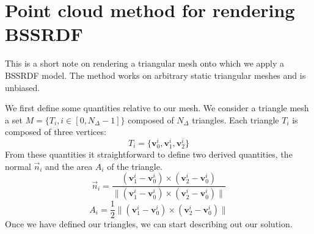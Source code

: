 \documentclass[10pt,a4paper]{article}
\begin{document}
 
\newcommand{\vecfunc}[2] {\vec{#1}(\mathbf{#2})}
\newcommand{\func}[2] {{#1}(\mathbf{#2})}
\newcommand{\omegafunc}[2] {{#1}(\mathbf{#2}, \vec{\omega})}

\newcommand{\xvecfunc}[1] {\vecfunc{#1}{x}}
\newcommand{\xfunc}[1] {\func{#1}{x}}
\newcommand{\xomegafunc}[1] {\omegafunc{#1}{x}}
\newcommand{\nablavec} {{\nabla}}
\newcommand{\omegavec} {\vec{\omega}}
\newcommand{\sphere}[2] {\int_{4\pi}{#1}\ d{\ifthenelse{\isempty{#2}{}}{{\omega}}{#2}}}
\newcommand{\hemisphere}[2] {\int_{2\pi_+}{#1}\ d{\ifthenelse{\isempty{#2}{}}{{\omega}}{#2}}}
\newcommand{\inwardhemisphere}[2] {\int_{2\pi_-}{#1}\ d{\ifthenelse{\isempty{#2}{}}{{\omega}}{#2}}}

\newcommand{\absorption}{\sigma_a}
\newcommand{\transmission}{\sigma_{tr}}
\newcommand{\scattering}{\sigma_s}
\newcommand{\extinction}{\sigma_t}
\newcommand{\fluence}{G_0}
\newcommand{\flux}{\mathbf{G}_1}
\newcommand{\sourcezero}[1]{\func{q}{#1}}
\newcommand{\sourcezerox}{\xfunc{q}}
\newcommand{\sourceone}[1]{\vec{\mathbf{Q}}(\mathbf{#1}, \omegavec)}
\newcommand{\sourceonex}{\vec{\mathbf{Q}}(\mathbf{x}, \omegavec)}
\newcommand{\redsca}{{\sigma}'_s}
\newcommand{\redext}{{\sigma}'_t}
\newcommand{\redscaEddington}{\tilde{\sigma}_s}
\newcommand{\redextEddington}{\tilde{\sigma}_t}
\newcommand{\de}{\text{d}}
\newcommand{\cphi}{C_{\phi}}
\newcommand{\cE}{C_{\mathbf{E}}}

\section*{Point cloud method for rendering BSSRDF}

This is a short note on rendering a triangular mesh onto which we apply a BSSRDF model. The method works on arbitrary static triangular meshes and is unbiased.

We first define some quantities relative to our mesh. We consider a triangle mesh a set $M = \{T_i, i \in [0, N_\Delta - 1] \}$ composed of $N_{\Delta}$ triangles. Each triangle $T_i$ is composed of three vertices:
$$
T_i = \{ \mathbf{v}^i_0, \mathbf{v}^i_1, \mathbf{v}^i_2 \}
$$
From these quantities it straightforward to define two derived quantities, the normal $\vec{n}_i$ and the area $A_i$ of the triangle. 
$$
\vec{n}_i = \frac{(\mathbf{v}^i_1 - \mathbf{v}^i_0) \times (\mathbf{v}^i_2 - \mathbf{v}^i_0) }{ \|(\mathbf{v}^i_1 - \mathbf{v}^i_0) \times (\mathbf{v}^i_2 - \mathbf{v}^i_0)  \|}
$$
$$
A_i = \frac{1}{2} \|(\mathbf{v}^i_1 - \mathbf{v}^i_0) \times (\mathbf{v}^i_2 - \mathbf{v}^i_0) \|
$$
Once we have defined our triangles, we can start describing out our solution. 
\end{document}
